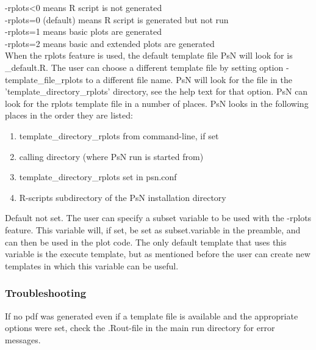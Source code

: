 \begin{optionlist}
-rplots<0 means R script is not generated\\ 
-rplots=0 (default) means R script is generated but not run\\ 
-rplots=1 means basic plots are generated\\													  
-rplots=2 means basic and extended plots are generated\\													  
\nextopt
{}
When the rplots feature is used, the default template file PsN will look for is 
\guidetoolname\_default.R. 
The user can choose a different template file
by setting option -template\_file\_rplots to a different file name. 
PsN will look for the file in the 'template\_directory\_rplots' directory, see the help text 
for that option.
\nextopt
{}
PsN can look for the rplots template file in a number of places. 
PsN looks in the following places in the order they are listed:
\begin{enumerate}
\item template\_directory\_rplots from command-line, if set 
\item calling directory (where PsN run is started from)
\item template\_directory\_rplots set in psn.conf 
\item R-scripts subdirectory of the PsN installation directory
\end{enumerate}
\nextopt
{}
Default not set. The user can specify a subset variable to be used with the -rplots feature. 
This variable
will, if set, be set as subset.variable in the preamble,
and can then be used in the plot code.  
The only default template that uses this variable is the execute template,
but as mentioned before the user can create new templates in which this variable
can be useful.
\nextopt
\end{optionlist}

\subsubsection*{Troubleshooting}
If no pdf was generated even if a template file is available and the appropriate options
were set, check the .Rout-file in the main run directory for error messages.
